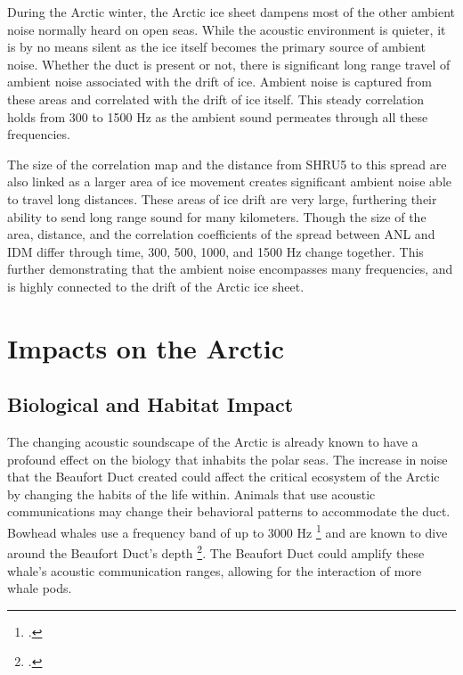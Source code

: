 During the Arctic winter, the Arctic ice sheet dampens most of the other ambient noise normally heard on open seas. While the acoustic environment is quieter, it is by no means silent as the ice itself becomes the primary source of ambient noise.  Whether the duct is present or not, there is significant long range travel of ambient noise associated with the drift of ice. Ambient noise is captured from these areas and correlated with the drift of ice itself. This steady correlation holds from 300 to 1500 Hz as the ambient sound permeates through all these frequencies.

The size of the correlation map and the distance from SHRU5 to this spread are also linked as a larger area of ice movement creates significant ambient noise able to travel long distances. These areas of ice drift are very large, furthering their ability to send long range sound for many kilometers. Though the size of the area, distance, and the correlation coefficients of the spread between ANL and IDM differ through time, 300, 500, 1000, and 1500 Hz change together. This further demonstrating that the ambient noise encompasses many frequencies, and is highly connected to the drift of the Arctic ice sheet.


\section{Impacts on the Arctic}

\subsection{Biological and Habitat Impact}

The changing acoustic soundscape of the Arctic is already known to have a profound effect on the biology that inhabits the polar seas. The increase in noise that the Beaufort Duct created could affect the critical ecosystem of the Arctic by changing the habits of the life within. Animals that use acoustic communications may change their behavioral patterns to accommodate the duct. Bowhead whales use a frequency band of up to 3000 Hz \footcite[]{clark1984sounds} and are known to dive around the Beaufort Duct's depth \footcite[]{simon2009behaviour}. The Beaufort Duct could amplify these whale's acoustic communication ranges, allowing for the interaction of more whale pods.

